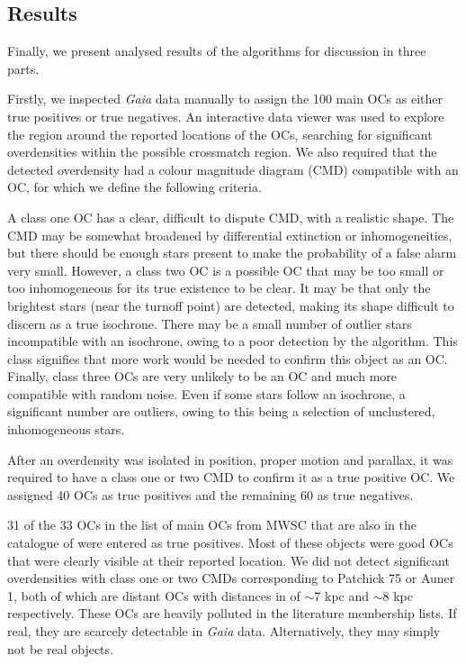 \subsection{Results}\label{c2:sec:analysis_results}

Finally, we present analysed results of the algorithms for discussion in three parts.

Firstly, we inspected \emph{Gaia} data manually to assign the 100 main OCs as either true positives or true negatives. An interactive data viewer was used to explore the region around the reported locations of the OCs, searching for significant overdensities within the possible crossmatch region. We also required that the detected overdensity had a colour magnitude diagram (CMD) compatible with an OC, for which we define the following criteria.

A class one OC has a clear, difficult to dispute CMD, with a realistic shape. The CMD may be somewhat broadened by differential extinction or inhomogeneities, but there should be enough stars present to make the probability of a false alarm very small. However, a class two OC is a possible OC that may be too small or too inhomogeneous for its true existence to be clear. It may be that only the brightest stars (near the turnoff point) are detected, making its shape difficult to discern as a true isochrone. There may be a small number of outlier stars incompatible with an isochrone, owing to a poor detection by the algorithm. This class signifies that more work would be needed to confirm this object as an OC. Finally, class three OCs are very unlikely to be an OC and much more compatible with random noise. Even if some stars follow an isochrone, a significant number are outliers, owing to this being a selection of unclustered, inhomogeneous stars.

After an overdensity was isolated in position, proper motion and parallax, it was required to have a class one or two CMD to confirm it as a true positive OC. We assigned 40 OCs as true positives and the remaining 60 as true negatives.

31 of the 33 OCs in the list of main OCs from MWSC that are also in the catalogue of \cite{cantat-gaudin_clusters_2020} were entered as true positives. Most of these objects were good OCs that were clearly visible at their reported location. We did not detect significant overdensities with class one or two CMDs corresponding to Patchick 75 or Auner 1, both of which are distant OCs with distances in \cite{cantat-gaudin_clusters_2020} of $\sim$7 kpc and $\sim$8 kpc respectively. These OCs are heavily polluted in the literature membership lists. If real, they are scarcely detectable in \emph{Gaia} data. Alternatively, they may simply not be real objects.

